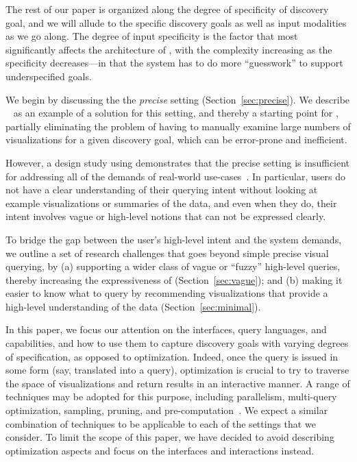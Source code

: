 \par
{}
The rest of our paper is organized along the degree of specificity
of discovery goal, and we will allude to the specific discovery
goals as well as input modalities as we go along. 
The degree of input specificity is the factor
that most significantly affects the architecture of \vida,
with the complexity increasing as the specificity decreases---in that
the system has to do more ``guesswork'' to support underspecified goals. 


\par We begin by discussing the 
the {\em precise} setting (Section~\ref{sec:precise}).
We describe \zv~\cite{Siddiqui2016} 
as an example of a solution for
this setting, and thereby a starting point for \vida,
partially eliminating the problem
of having to manually examine large numbers 
of visualizations for a given discovery goal, 
which can be error-prone and inefficient.

\par However, a design study using \zv demonstrates
that the precise setting is insufficient for
addressing all of the demands of real-world use-cases~\cite{Lee2017}.
In particular, users do not have
a clear understanding of their querying intent without looking at example visualizations or summaries of the data, and even when they do, their intent involves
vague or high-level notions that can not be expressed clearly.

\par To bridge the gap between the user's high-level
intent and the system demands,
we outline a set of research challenges
that goes beyond simple precise visual querying, by
(a) supporting a wider class of vague or ``fuzzy'' high-level
queries, thereby increasing the expressiveness
of \vida (Section~\ref{sec:vague});
and 
(b) making it easier to know what to query
by recommending visualizations that provide
a high-level understanding of the data (Section~\ref{sec:minimal}).

In this paper, we focus our attention on the interfaces,
query languages, and capabilities, 
and how to use them to capture discovery goals
with varying degrees of specification, as opposed to optimization.
Indeed, once the query is issued in some form 
(say, translated into a \vidaql
query),
optimization is crucial to try to traverse the space 
of visualizations and return results in an interactive manner.
A range of techniques may be adopted for this purpose,
including parallelism, multi-query optimization, sampling,
pruning, and pre-computation~\cite{Siddiqui2016,Vartak2015}.
We expect a similar combination of techniques to be applicable to
each of the settings that we consider. To limit the scope of this paper, we have
decided to avoid describing optimization aspects and focus on the interfaces and interactions instead.


